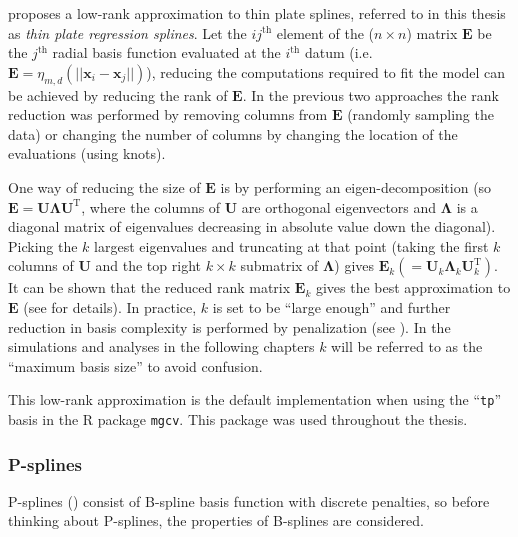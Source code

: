  proposes a low-rank approximation to thin plate splines, referred to in this thesis as \textit{thin plate regression splines}. Let the $ij^\text{th}$ element of the ($n \times n$) matrix $\mathbf{E}$ be the $j^\text{th}$ radial basis function evaluated at the $i^\text{th}$ datum (i.e. $\mathbf{E} = \eta_{m,d}\left (\vert\vert\mathbf{x}_i - \mathbf{x}_j \vert\vert \right )$), reducing the computations required to fit the model can be achieved by reducing the rank of $\mathbf{E}$. In the previous two approaches the rank reduction was performed by removing columns from $\mathbf{E}$ (randomly sampling the data) or changing the number of columns by changing the location of the evaluations (using knots). 

One way of reducing the size of $\mathbf{E}$ is by performing an eigen-decomposition (so $\mathbf{E}=\mathbf{U}\mathbf{\Lambda}\mathbf{U}^\text{T}$, where the columns of $\mathbf{U}$ are orthogonal eigenvectors and $\mathbf{\Lambda}$ is a diagonal matrix of eigenvalues decreasing in absolute value down the diagonal). Picking the $k$ largest eigenvalues and truncating at that point (taking the first $k$ columns of $\mathbf{U}$ and the top right $k\times k$ submatrix of $\mathbf{\Lambda}$) gives $\mathbf{E}_k(=\mathbf{U}_k\mathbf{\Lambda}_k\mathbf{U}_k^\text{T})$. It can be shown that the reduced rank matrix $\mathbf{E}_k$ gives the best approximation to $\mathbf{E}$ (see \cite{wood2003} for details). In practice, $k$ is set to be ``large enough'' and further reduction in basis complexity is performed by penalization (see ). In the simulations and analyses in the following chapters $k$ will be referred to as the ``maximum basis size'' to avoid confusion.

This low-rank approximation is the default implementation when using the ``\texttt{tp}'' basis in the \textsf{R} package \texttt{mgcv}. This package was used throughout the thesis.

\subsubsection{P-splines}
\label{intro-psplines}

P-splines (\cite{eilersmarx96}) consist of B-spline basis function with discrete penalties, so before thinking about P-splines, the properties of B-splines are considered. 

